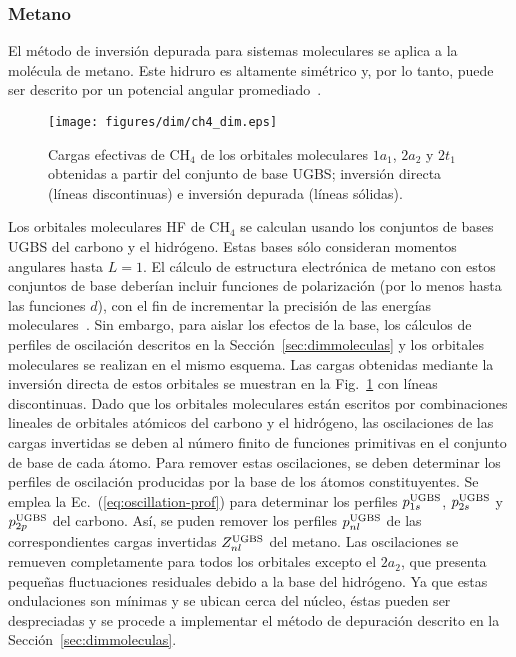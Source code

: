 {{{{\newpage
\subsubsection*{Metano}

El método de inversión depurada para sistemas moleculares se aplica a 
la molécula de metano. Este hidruro es altamente simétrico y, por lo 
tanto, puede ser descrito por un potencial angular 
promediado~\cite{Granados:16}. 

\begin{figure}[t]
\centering
\texttt{[image: figures/dim/ch4\_dim.eps]}
\caption[Cargas invertidas y depuradas de metano.]
{Cargas efectivas de CH$_4$ de los orbitales moleculares $1a_1$, $2a_2$ 
y $2t_1$ obtenidas a partir del conjunto de base UGBS; inversión directa 
(líneas discontinuas) e inversión depurada (líneas sólidas).}
\label{fig:ch4zeff}
\end{figure}

Los orbitales moleculares HF de CH$_4$ se calculan usando los conjuntos 
de bases UGBS del carbono y el hidrógeno. Estas bases sólo consideran 
momentos angulares hasta $L=1$. El cálculo de estructura electrónica de 
metano con estos conjuntos de base deberían incluir funciones de 
polarización (por lo menos hasta las funciones $d$), con el fin de 
incrementar la precisión de las energías moleculares~\cite{Rothenberg:71,
Hariharan:72}. Sin embargo, para aislar los efectos de la base, los 
cálculos de perfiles de oscilación descritos en la 
Sección~\ref{sec:dimmoleculas} y los orbitales moleculares se realizan 
en el mismo esquema. Las cargas obtenidas mediante la inversión directa 
de estos orbitales se muestran en la Fig.~\ref{fig:ch4zeff} con líneas 
discontinuas. Dado que los orbitales moleculares están escritos por 
combinaciones lineales de orbitales atómicos del carbono y el hidrógeno, 
las oscilaciones de las cargas invertidas se deben al número finito de 
funciones primitivas en el conjunto de base de cada átomo. Para remover 
estas oscilaciones, se deben determinar los perfiles de oscilación 
producidas por la base de los átomos constituyentes. Se emplea la 
Ec.~(\ref{eq:oscillation-prof}) para determinar los perfiles 
$p_{1s}^{\mbox{\scriptsize UGBS}}$, $p_{2s}^{\mbox{\scriptsize UGBS}}$ y 
$p_{2p}^{\mbox{\scriptsize UGBS}}$ del carbono. Así, se puden remover 
los perfiles $p_{nl}^{\mbox{\scriptsize UGBS}}$ de las correspondientes 
cargas invertidas $Z_{nl}^{\mbox{\scriptsize UGBS}}$ del metano. Las 
oscilaciones se remueven completamente para todos los orbitales excepto 
el $2a_2$, que presenta pequeñas fluctuaciones residuales debido a la 
base del hidrógeno. Ya que estas ondulaciones son mínimas y se ubican 
cerca del núcleo, éstas pueden ser despreciadas y se procede a 
implementar el método de depuración descrito en la 
Sección~\ref{sec:dimmoleculas}. 

}}}}
